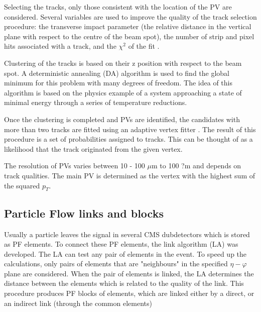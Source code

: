 \begin{small}
Selecting the tracks, only those consistent with the location of the PV are considered. Several variables are used to improve the quality of the track selection procedure: the transverse impact parameter (the relative distance in the vertical plane with respect to the centre of the beam spot),  the number of strip and pixel hits associated with a track, and the $\chi^2$ of the fit .

Clustering of the tracks is based on their z position with respect to the beam spot. A deterministic annealing (DA) algorithm \cite{DeterministicAnnealing} is used to find the global minimum for this problem with many degrees of freedom. The idea of this algorithm is based on the physics example of a system approaching a state of minimal energy through a series of temperature  reductions. 

Once the clustering is completed and PVs are identified, the candidates with more than two tracks are fitted using an adaptive vertex fitter \cite{AdaptiveVertexFitting}. The result of this procedure is a set of probabilities assigned to tracks. This can be thought of as a likelihood that the track originated from the given vertex.


The resolution of PVs varies between 10 - 100 $\mu$m to 100 ?m and depends on track qualities. The main PV is determined as the vertex with the highest sum of the squared $p_T$.


\subsection{Particle Flow links and blocks}\label{sec:some_reconstruction}

Usually a particle leaves the signal in several CMS dubdetectors which is stored as PF \cite{ParticleFlow} elements. To connect these PF elements, the link algorithm (LA) was developed. The LA can test any pair of elements in the event. To speed up the calculations, only pairs of elements that are "neighbours" in the specified $\eta - \varphi$ plane are considered. When the pair of elements is linked, the LA determines the distance between the elements which is related to the quality of the link. This procedure produces PF blocks of elements, which are linked either by a direct, or an indirect link (through the common elements)


  

\end{small}
